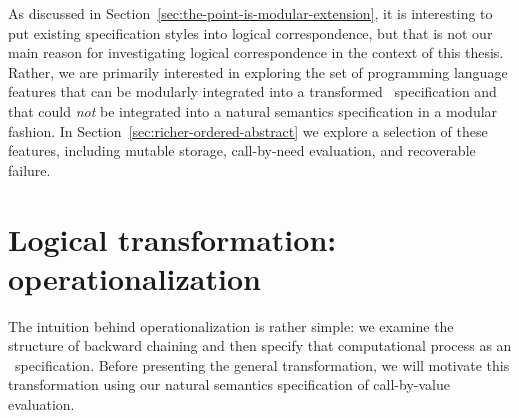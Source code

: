 As discussed in Section~\ref{sec:the-point-is-modular-extension}, it
is interesting to put existing specification styles into logical
correspondence, but that is not our main reason for investigating
logical correspondence in the context of this thesis. Rather, we are
primarily interested in exploring the set of programming language
features that can be modularly integrated into a transformed
\sls~specification and that could {\it not} be integrated into a natural
semantics specification in a modular fashion.  
In Section~\ref{sec:richer-ordered-abstract}
we explore a selection of these features, including mutable storage,
call-by-need evaluation, and recoverable failure.

\section{Logical transformation: operationalization}
\label{sec:operationalization}

The intuition behind operationalization is rather simple: we examine
the structure of backward chaining and then specify that
computational process as an \sls~specification.  Before presenting
the general transformation, we will motivate this transformation using
our natural semantics specification of call-by-value evaluation. 

